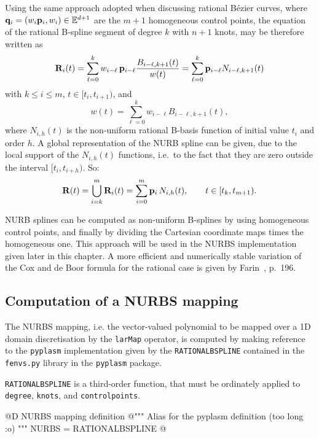 \documentclass[11pt,oneside]{article}	%
\def\E{\mathbb{E}}
\def\p#1{{\bf #1}}
\begin{document}
Using the same approach adopted when discussing rational B\'ezier
curves, where $\p{q}_{i} = (w_{i}\p{p}_{i}, w_{i})\in\E^{d+1}$ are the
$m+1$ homogeneous control points, the equation of the rational
B-spline segment of degree $k$ with $n+1$ knots, may be therefore
written as
\begin{equation}
    \p{R}_i(t) = 
    \sum_{\ell=0}^k 
    w_{i-\ell}\,\p{p}_{i-\ell} 
    {B_{i-\ell,k+1}(t) \over w(t)}
 = 
    \sum_{\ell=0}^k 
    \p{p}_{i-\ell} 
    N_{i-\ell,k+1}(t)
    \label{eq:NUBgeneriche1}
\end{equation}
with $ k\leq i\leq m$,  $t\in [t_{i}, t_{i+1})$, and
\[
w(t) = \sum_{\ell=0}^k
w_{i-\ell} B_{i-\ell,k+1}(t),
\]
where $N_{i,h}(t)$ is the non-uniform rational
B-basis function of initial value $t_{i}$ and order $h$.
A global representation of the NURB spline can be given, due to the 
local support of the $N_{i,h}(t)$ functions, i.e.~to the fact that 
they are zero outside the interval $[t_{i},t_{i+h})$. So:
\[
\p{R}(t) =  \bigcup_{i=k}^{m} \p{R}_i(t) = 
\sum_{i=0}^{m}\p{p}_{i}\,N_{i,h}(t), \qquad t\in [t_{k},t_{m+1}).
\]

NURB splines can be computed as non-uniform B-splines by using homogeneous
control points, and finally by dividing the Cartesian coordinate
maps times the homogeneous one.  This approach will be used in
the NURBS implementation given later in this chapter.  A more
efficient and numerically stable variation of the Cox and de Boor
formula for the rational case is given by
Farin~\cite{Farin:88}, p.~196.


\subsection{Computation of a NURBS mapping}

The NURBS mapping, i.e. the vector-valued polynomial to be mapped over a 1D domain
discretisation by the \texttt{larMap} operator, is computed by making reference to the 
\texttt{pyplasm} implementation given by the \texttt{RATIONALBSPLINE} contained in the 
\texttt{fenvs.py} library in the \texttt{pyplasm} package.

\texttt{RATIONALBSPLINE} is a third-order function, that must be ordinately applied to 
\texttt{degree}, \texttt{knots}, and \texttt{controlpoints}.

@D NURBS mapping definition
@{""" Alias for the pyplasm definition (too long :o) """
NURBS = RATIONALBSPLINE
@}
\end{document}
